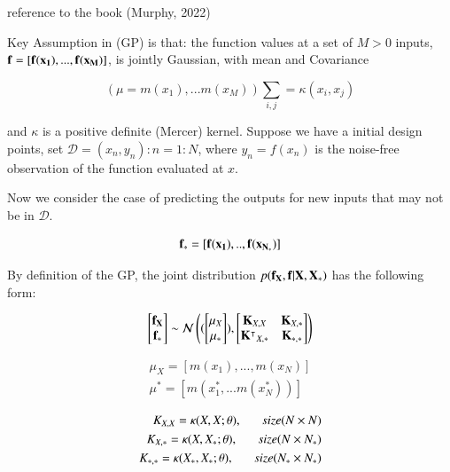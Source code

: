 \documentclass[]{elsarticle} %
\begin{document}
reference to the book (Murphy, 2022)

Key Assumption in (GP) is that: the function values at a set of \(M > 0\)
inputs, \(\bf{f} = [f(x_1), ...,f(x_M)]\), is jointly Gaussian, with mean
and Covariance

\begin{equation}
(\mu = m(x_1),...m(x_M))
\sum_{i,j}= \kappa(x_i,x_j)
\label{eq:mean_cov}
\end{equation}

and \(\kappa\) is a positive definite (Mercer) kernel. Suppose we have a
initial design points, set \(\mathcal{D} = {(x_n, y_n) : n = 1 : N}\),
where \(y_n = f(x_n)\) is the noise-free observation of the function
evaluated at \(x\).

Now we consider the case of predicting the outputs for new inputs that
may not be in \(\mathcal{D}\).

\begin{equation}
\bf{f_{*}} = [f(x_1),.., f(x_{N_{*}})]
\label{eq:pred_fun}
\end{equation}

By definition of the GP, the joint distribution \(p(\bf{f_X},f|X,X_*)\)
has the following form:

\begin{equation}
\begin{bmatrix}  {\bf {f}_X}  \\  {{\bf f}_*} \end{bmatrix} \sim\mathcal{N} \begin{pmatrix} (\begin{bmatrix}  {{\bf \mu}_X}  \\  {{\bf \mu}_*} \end{bmatrix}),\begin{bmatrix} {{\bf K}_{X,X}}  & {{\bf
K}_{X,*}}  \\  {{\bf \mathbf{K}^\intercal}_{X,*}} & {{\bf K}_{*,*} } \end{bmatrix}\end{pmatrix}
\label{eq:gp_model}
\end{equation}

\begin{equation}
  \begin{split}
\mu_X = [m(x_1),...,m(x_N)] \\ 
\mu^\ast = [m(x^\ast_1,...m(x^\ast_N))]
  \end{split}
\label{eq:mu_val}
\end{equation}

\begin{equation}
 \begin{split}
K_{X,X} = {\Large \kappa} (X,X; \theta) , \; \; \; \; \; \ size (N \times  N) \\
K_{X,\ast} = {\Large \kappa} (X,X_\ast; \theta), \; \; \; \; \; \ size (N \times N_*) \\
K_{\ast,\ast} = {\Large \kappa} (X_\ast, X_\ast; \theta), \; \; \; \; \; \ size(N_\ast \times N_\ast)
 \end{split}
\label{eq:cov_sign}
\end{equation}
\end{document}
